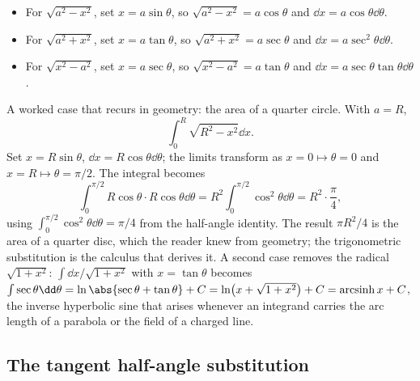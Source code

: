 \begin{itemize}[leftmargin=*]
  \item For $\sqrt{a^{2} - x^{2}}$, set $x = a\sin\theta$, so
    $\sqrt{a^{2} - x^{2}} = a\cos\theta$ and $\dd x = a\cos\theta
    \dd\theta$.
  \item For $\sqrt{a^{2} + x^{2}}$, set $x = a\tan\theta$, so
    $\sqrt{a^{2} + x^{2}} = a\sec\theta$ and $\dd x = a\sec^{2}
    \theta\dd\theta$.
  \item For $\sqrt{x^{2} - a^{2}}$, set $x = a\sec\theta$, so
    $\sqrt{x^{2} - a^{2}} = a\tan\theta$ and $\dd x = a\sec\theta
    \tan\theta\dd\theta$.
\end{itemize}

A worked case that recurs in geometry: the area of a quarter circle.
With $a = R$,
\[
\int_{0}^{R}\sqrt{R^{2} - x^{2}}\dd x.
\]
Set $x = R\sin\theta$, $\dd x = R\cos\theta\dd\theta$; the limits
transform as $x = 0 \mapsto \theta = 0$ and $x = R \mapsto \theta =
\pi/2$. The integral becomes
\[
\int_{0}^{\pi/2} R\cos\theta \cdot R\cos\theta \dd\theta =
R^{2}\int_{0}^{\pi/2}\cos^{2}\theta\dd\theta = R^{2}\cdot
\frac{\pi}{4},
\]
using $\int_{0}^{\pi/2}\cos^{2}\theta\dd\theta = \pi/4$ from the
half-angle identity. The result $\pi R^{2}/4$ is the area of a
quarter disc, which the reader knew from geometry; the trigonometric
substitution is the calculus that derives it. A second case removes
the radical $\sqrt{1 + x^{2}}$: $\int \dd x/\sqrt{1 + x^{2}}$ with
$x = \tan\theta$ becomes $\int \sec\theta\dd\theta = \ln\abs{\sec
\theta + \tan\theta} + C = \ln\bigl(x + \sqrt{1 + x^{2}}\bigr) +
C = \operatorname{arcsinh} x + C$, the inverse hyperbolic sine that
arises whenever an integrand carries the arc length of a parabola
or the field of a charged line.

\subsection{The tangent half-angle substitution}


